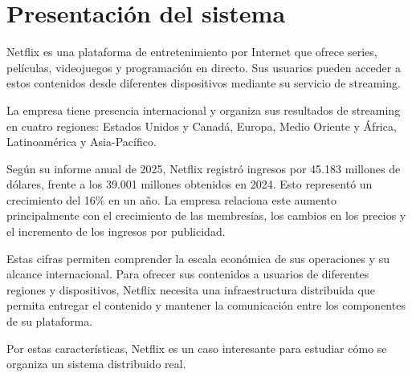 
\section{Presentación del sistema}

Netflix es una plataforma de entretenimiento por Internet que ofrece series, películas, videojuegos y programación en directo. Sus usuarios pueden acceder a estos contenidos desde diferentes dispositivos mediante su servicio de streaming.

La empresa tiene presencia internacional y organiza sus resultados de streaming en cuatro regiones: Estados Unidos y Canadá, Europa, Medio Oriente y África, Latinoamérica y Asia-Pacífico.

Según su informe anual de 2025, Netflix registró ingresos por 45.183 millones de dólares, frente a los 39.001 millones obtenidos en 2024. Esto representó un crecimiento del 16\% en un año. La empresa relaciona este aumento principalmente con el crecimiento de las membresías, los cambios en los precios y el incremento de los ingresos por publicidad.

Estas cifras permiten comprender la escala económica de sus operaciones y su alcance internacional. Para ofrecer sus contenidos a usuarios de diferentes regiones y dispositivos, Netflix necesita una infraestructura distribuida que permita entregar el contenido y mantener la comunicación entre los componentes de su plataforma.

Por estas características, Netflix es un caso interesante para estudiar cómo se organiza un sistema distribuido real.

\parencite{netflix2025annual}
